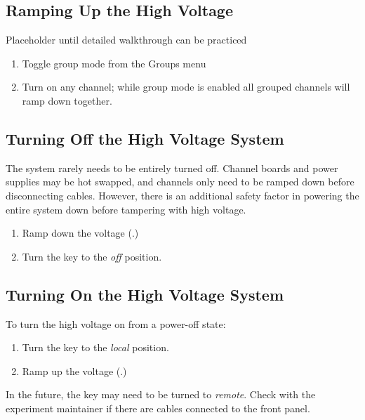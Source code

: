 \subsection{Ramping Up the High Voltage}
\label{sec:op_high_voltage:rampup}

\FIXME{} Placeholder until detailed walkthrough can be practiced

\begin{enumerate}
\item Toggle group mode from the Groups menu
\item Turn on any channel; while group mode is enabled all grouped channels will ramp down together.
\end{enumerate}


\subsection{Turning Off the High Voltage System}
\label{sec:op_high_voltage:turnoff}

The system rarely needs to be entirely turned off.  Channel boards and power supplies may be hot swapped, and channels only need to be ramped down before disconnecting cables.  However, there is an additional safety factor in powering the entire system down before tampering with high voltage.

\begin{enumerate}
\item Ramp down the voltage (.)
\item Turn the key to the \textit{off} position.
\end{enumerate}

\subsection{Turning On the High Voltage System}
\label{sec:op_high_voltage:turnoff}

To turn the high voltage on from a power-off state:
\begin{enumerate}
\item Turn the key to the \textit{local} position.
\item Ramp up the voltage (.)
\end{enumerate}

\begin{note}
  In the future, the key may need to be turned to \emph{remote}.  Check with the experiment maintainer if there are cables connected to the front panel.
\end{note}


